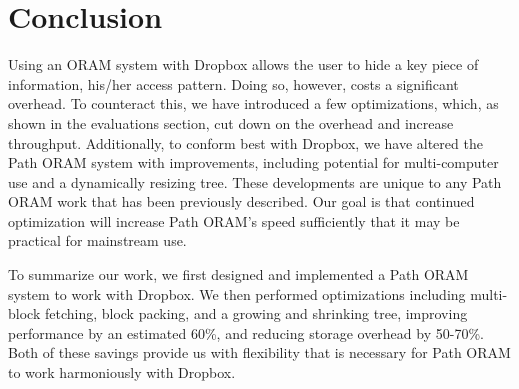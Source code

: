 \documentclass[conference]{IEEEtran}
\begin{document}
%





\section{Conclusion}
Using an ORAM system with Dropbox allows the user to hide a key piece of information, his/her access pattern. Doing so, however, costs a significant overhead. To counteract this, we have introduced a few optimizations, which, as shown in the evaluations section, cut down on the overhead and increase throughput. Additionally, to conform best with Dropbox, we have altered the Path ORAM system with improvements, including potential for multi-computer use and a dynamically resizing tree. These developments are unique to any Path ORAM work that has been previously described. Our goal is that continued optimization will increase Path ORAM’s speed sufficiently that it may be practical for mainstream use. 

To summarize our work, we first designed and implemented a Path ORAM system to work with Dropbox. We then performed optimizations including multi-block fetching, block packing, and a growing and shrinking tree, improving performance by an estimated 60\%, and reducing storage overhead by 50-70\%. Both of these savings provide us with flexibility that is necessary for Path ORAM to work harmoniously with Dropbox.
\end{document}
